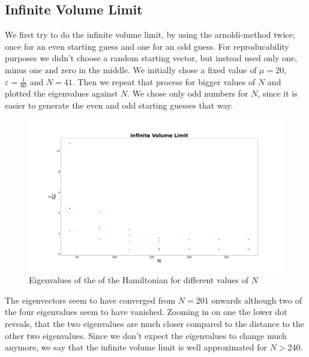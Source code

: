 \documentclass[11pt, letterpaper, onecolumn]{article}
\begin{document}
  
 	\subsection{Infinite Volume Limit}
  	We first try to do the infinite volume limit, by using the arnoldi-method twice; once for an even starting guess and one for an odd guess. For reproducability purposes we didn't choose a random starting vector, but instead used only one, minus one and zero in the middle. We initially chose a fixed value of $\mu=20$, $\varepsilon=\frac{1}{60}$ and $N=41$. Then we repeat that process for bigger values of $N$ and plotted the eigenvalues against $N$. We chose only odd numbers for $N$, since it is easier to generate the even and odd starting guesses that way.
    	\begin{figure} [H] 
	\begin{center}
	\includegraphics[width=15cm]{"inf_vol_lim_final.png"}
	\caption{Eigenvalues of the of the Hamiltonian for different values of $N$}
	\end{center}
	\end{figure}
	The eigenvectors seem to have converged from $N=201$ onwards although two of the four eigenvalues seem to have vanished. Zooming in on one the lower dot reveals, that the two eigenvalues are much closer compared to the distance to the other two eigenvalues. Since we don't expect the eigenvalues to change much anymore, we say that the infinite volume limit is well approximated for $N>240$. 
\end{document}

